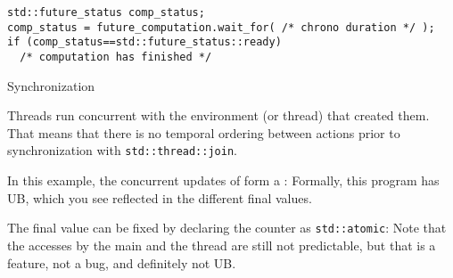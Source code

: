 \begin{lstlisting}
std::future_status comp_status;
comp_status = future_computation.wait_for( /* chrono duration */ );
if (comp_status==std::future_status::ready)
  /* computation has finished */
\end{lstlisting}

 {Synchronization}

Threads run concurrent with the environment (or thread)
that created them.
That means that there is no temporal ordering between actions
prior to synchronization with \lstinline+std::thread::join+.

In this example, the concurrent updates of 
form a :
%
%
Formally, this program has \acf{UB},
which you see reflected in the different final values.

The final value can be fixed by declaring the counter
as \lstinline+std::atomic+:
%
%
Note that the accesses by the main and the thread
are still not predictable, but that is a feature,
not a bug, and definitely not \ac{UB}.
